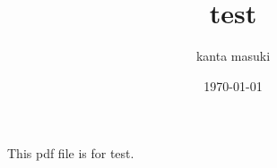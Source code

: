 \documentclass[a4j,11pt]{jsarticle}
\numberwithin{equation}{section}
\theoremstyle{definition}
\begin{document}
\title{test}
\author{kanta masuki}
\date{\today}
\maketitle


This pdf file is for test.
\end{document}
